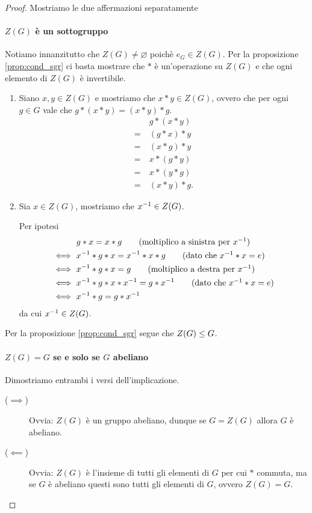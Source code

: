 \begin{proof} Mostriamo le due affermazioni separatamente

    \paragraph{$Z(G)$ è un sottogruppo} 
    Notiamo innanzitutto che $Z(G) \neq \varnothing$ poichè $e_G \in Z(G)$. Per la proposizione \ref{prop:cond_sgr} ci basta mostrare che $*$ è un'operazione su $Z(G)$ e che ogni elemento di $Z(G)$ è invertibile.

    \begin{enumerate}
        [label={(\arabic*)}]
        \item Siano $x, y \in Z(G)$ e mostriamo che $x*y \in Z(G)$, ovvero che per ogni $g \in G$ vale che $g*(x*y) = (x*y)*g$. 
        \begin{align*}
            &g*(x*y) \tag*{(per (G1))}\\
            =\ &(g*x)*y \tag*{(dato che $x \in \Z(G)$)}\\
            =\ &(x*g)*y \tag*{(per (G1))}\\
            =\ &x*(g*y) \tag*{(dato che $x \in \Z(G)$)} \\
            =\ &x*(y*g) \tag*{(per (G1))}\\
            =\ &(x*y)*g.
        \end{align*}
        \item Sia $x \in Z(G)$, mostriamo che $x^{-1} \in Z(G)$.
        
        Per ipotesi \begin{align*}
            &g*x = x*g \tag*{(moltiplico a sinistra per $x\inv$)} \\
            \iff\ &x\inv * g*x = x\inv * x*g\tag*{(dato che $x\inv * x = e$)} \\
            \iff\ &x\inv * g*x = g \tag*{(moltiplico a destra per $x\inv$)} \\
            \iff\ &x\inv * g*x*x\inv = g*x\inv \tag*{(dato che $x\inv * x = e$)} \\
            \iff\ &x\inv * g = g*x\inv
        \end{align*}
        da cui $x^{-1} \in Z(G)$.
    \end{enumerate}

    Per la proposizione \ref{prop:cond_sgr} segue che $Z(G) \leq G$.

    \paragraph{$Z(G) = G$ se e solo se $G$ abeliano} Dimostriamo entrambi i versi dell'implicazione.
    \begin{description}
        \item[($\implies$)] Ovvia: $Z(G)$ è un gruppo abeliano, dunque se $G = Z(G)$ allora $G$ è abeliano.
        \item[($\impliedby$)]  Ovvia: $Z(G)$ è l'insieme di tutti gli elementi di $G$ per cui $*$ commuta, ma se $G$ è abeliano questi sono tutti gli elementi di $G$, ovvero $Z(G) = G$.  \qedhere
    \end{description}
\end{proof}

